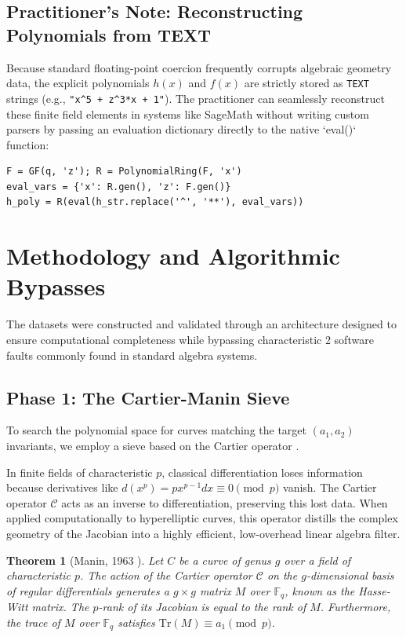\documentclass[letterpaper, 11pt]{article}
\newtheorem{theorem}{Theorem}[section]
\begin{document}
\subsection{Practitioner's Note: Reconstructing Polynomials from TEXT}
Because standard floating-point coercion frequently corrupts algebraic geometry data, the explicit polynomials $h(x)$ and $f(x)$ are strictly stored as \texttt{TEXT} strings (e.g., \texttt{"x\textasciicircum 5 + z\textasciicircum 3*x + 1"}). The practitioner can seamlessly reconstruct these finite field elements in systems like SageMath without writing custom parsers by passing an evaluation dictionary directly to the native `eval()` function:
\begin{verbatim}
F = GF(q, 'z'); R = PolynomialRing(F, 'x')
eval_vars = {'x': R.gen(), 'z': F.gen()}
h_poly = R(eval(h_str.replace('^', '**'), eval_vars))
\end{verbatim}

\section{Methodology and Algorithmic Bypasses}
The datasets were constructed and validated through an architecture designed to ensure computational completeness while bypassing characteristic 2 software faults commonly found in standard algebra systems.

\subsection{Phase 1: The Cartier-Manin Sieve}
To search the polynomial space for curves matching the target $(a_1, a_2)$ invariants, we employ a sieve based on the Cartier operator \cite{Cartier1958}. 

In finite fields of characteristic $p$, classical differentiation loses information because derivatives like $d(x^p) = px^{p-1} dx \equiv 0 \pmod p$ vanish. The Cartier operator $\mathcal{C}$ acts as an inverse to differentiation, preserving this lost data. When applied computationally to hyperelliptic curves, this operator distills the complex geometry of the Jacobian into a highly efficient, low-overhead linear algebra filter.

\begin{theorem}[Manin, 1963 \cite{Manin1963}]
Let $C$ be a curve of genus $g$ over a field of characteristic $p$. The action of the Cartier operator $\mathcal{C}$ on the $g$-dimensional basis of regular differentials generates a $g \times g$ matrix $M$ over $\mathbb{F}_q$, known as the Hasse-Witt matrix. The $p$-rank of its Jacobian is equal to the rank of $M$. Furthermore, the trace of $M$ over $\mathbb{F}_q$ satisfies $\text{Tr}(M) \equiv a_1 \pmod p$.
\end{theorem}
\end{document}
